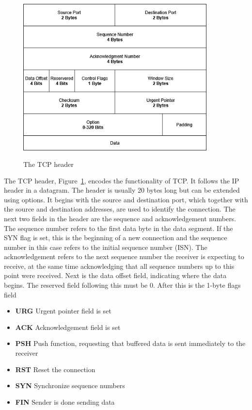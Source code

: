 \documentclass[english, 12pt, a4paper, elec, utf8, a-2b, online]{aaltothesis}
\begin{document}
\begin{figure}[t]
	\centering
	\includegraphics[alt={A block diagram of the TCP header format, detailing its fields and their sizes.}, height=8cm]{./images/tcp_header.png}
	\caption{The TCP header}
	\label{fig:tcp_header}
\end{figure}
The TCP header, Figure~\ref{fig:tcp_header}, encodes the functionality of TCP.
It follows the IP header in a datagram. The header is usually 20 bytes long but
can be extended using options. It begins with the source and destination port, which
together with the source and destination addresses, are used to identify the connection.
The next two fields in the header are the sequence and acknowledgement numbers. The
sequence number refers to the first data byte in the data segment.
If the SYN flag is set, this is the beginning of a new connection and the sequence
number in this case refers to the initial sequence number (ISN). The acknowledgement
refers to the next sequence number the receiver is
expecting to receive, at the same time acknowledging that all sequence numbers
up to this point were received. Next is the data offset field, indicating where
the data begins. The reserved field following this must be 0. After this is the
1-byte flags field
\begin{itemize}
	\item \textbf{URG} Urgent pointer field is set
	\item \textbf{ACK} Acknowledgement field is set
	\item \textbf{PSH} Push function, requesting that buffered data is sent immediately to the receiver
	\item \textbf{RST} Reset the connection
	\item \textbf{SYN} Synchronize sequence numbers
	\item \textbf{FIN} Sender is done sending data
\end{itemize}
\end{document}
